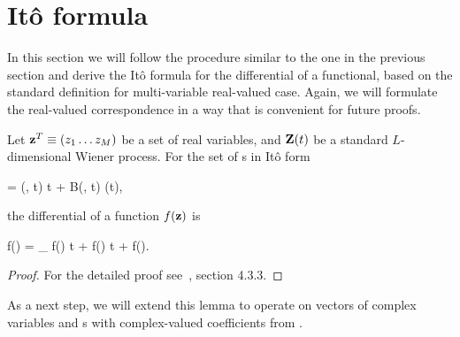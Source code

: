 \section{It\^o formula}

In this section we will follow the procedure similar to the one in the previous section and derive the It\^o formula for the differential of a functional, based on the standard definition for multi-variable real-valued case.
Again, we will formulate the real-valued correspondence in a way that is convenient for future proofs.

\begin{lemma}
\label{lmm:fpe-sde:ito-formula:ito-f-real}
	Let $\mathbf{z}^T \equiv (z_1 \ldots z_M)$ be a set of real variables, and $\mathbf{Z}(t)$ be a standard $L$-dimensional Wiener process.
	For the set of s in It\^o form
	\begin{eqn*}
		\upd\zvec = \avec(\zvec, t) \upd t + B(\zvec, t) \upd\Zvec(t),
	\end{eqn*}
	the differential of a function $f(\mathbf{z})$ is
	\begin{eqn*}
		\upd f(\zvec) =
			\avec \cdot \vcwd_{\zvec} f(\zvec) \upd t
			+   f(\zvec) \upd t
			+  f(\zvec).
	\end{eqn*}
\end{lemma}
\begin{proof}
For the detailed proof see~\cite{Gardiner1997}, section 4.3.3.
\end{proof}

As a next step, we will extend this lemma to operate on vectors of complex variables and s with complex-valued coefficients from .

